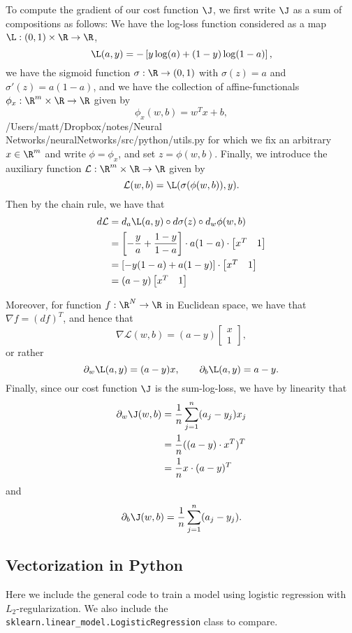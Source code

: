 To compute the gradient of our cost function $\J$, we first write $\J$ as a sum of compositions as follows:  We have the log-loss function considered as a map $\L:(0,1)\times\R\to\R$,
$$\L(a,y)=-\left[y\log(a)+(1-y)\log(1-a)\right],$$
we have the sigmoid function $\sigma:\R\to(0,1)$ with $\sigma(z)=a$ and $\sigma'(z)=a(1-a)$, and we have the collection of affine-functionals $\phi_x:\R^m\times\R\to\R$ given by
$$\phi_x(w,b)=w^Tx+b,$$/Users/matt/Dropbox/notes/Neural Networks/neuralNetworks/src/python/utils.py
for which we fix an arbitrary $x\in\R^m$ and write $\phi=\phi_x$, and set $z=\phi(w,b)$.  Finally, we introduce the auxiliary function $\mathcal{L}:\R^m\times\R\to\R$ given by
$$\mathcal{L}(w,b)=\L(\sigma(\phi(w,b)),y).$$
Then by the chain rule, we have that
\begin{align*}
	d\mathcal{L}&=d_a\L(a,y)\circ d\sigma(z)\circ d_w\phi(w,b)\\
	&=\left[-\frac{y}{a}+\frac{1-y}{1-a}\right]\cdot a(1-a)\cdot\begin{bmatrix}
		x^T&1
	\end{bmatrix}\\
	&=[-y(1-a)+a(1-y)]\cdot \begin{bmatrix}
		x^T&1
	\end{bmatrix}\\
	&=(a-y)\begin{bmatrix}
		x^T&1
	\end{bmatrix}
\end{align*}

Moreover, for function $f:\R^N\to\R$ in Euclidean space, we have that $\nabla f = (df)^T$, and hence that
$$\nabla\mathcal{L}(w,b)=(a-y)\begin{bmatrix}
	x\\
	1
\end{bmatrix},$$
or rather
$$\partial_w\L(a,y)=(a-y)x,\qquad \partial_b\L(a,y)=a-y.$$
Finally, since our cost function $\J$ is the sum-log-loss, we have by linearity that
\begin{align*}
	\partial_w\J(w,b)&=\frac{1}{n}\sum_{j=1}^n(a_j-y_j)x_j\\
	&=\frac{1}{n}((a-y)\cdot x^T)^T\\
	&=\frac{1}{n}x\cdot(a-y)^T
\end{align*}
and
$$\partial_b\J(w,b)=\frac{1}{n}\sum_{j=1}^n(a_j-y_j).$$


\subsection{Vectorization in Python}
Here we include the general code to train a model using logistic regression with $L_2$-regularization.  We also include the \\\texttt{sklearn.linear\_model.LogisticRegression} class to compare.


